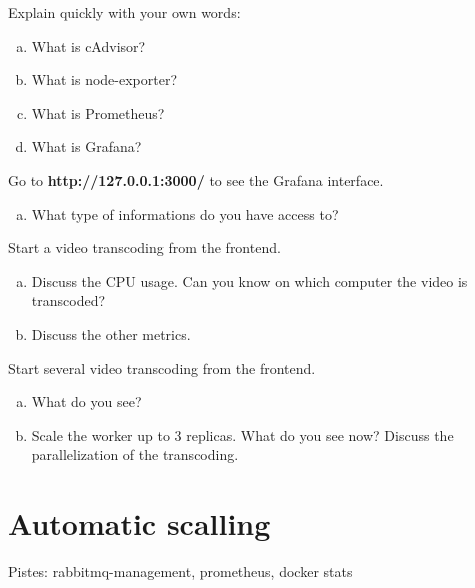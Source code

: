 \documentclass[a4paper,11pt]{exam}
\begin{document}
\begin{questions}
	\question Explain quickly with your own words:
	\begin{enumerate}[(a)]
		\item What is cAdvisor?
		\item What is node-exporter?
		\item What is Prometheus?
		\item What is Grafana?
	\end{enumerate}
	\question Go to \textbf{http://127.0.0.1:3000/} to see the Grafana interface.
	\begin{enumerate}[(a)]
		\item What type of informations do you have access to?
	\end{enumerate}
	\question Start a video transcoding from the frontend.
	\begin{enumerate}[(a)]
		\item Discuss the CPU usage. Can you know on which computer the video is transcoded?
		\item Discuss the other metrics.
	\end{enumerate}

	\question Start several video transcoding from the frontend.
	\begin{enumerate}[(a)]
		\item What do you see?  
		\item Scale the worker up to 3 replicas. What do you see now? Discuss the parallelization of the transcoding.
	\end{enumerate}
\end{questions}


\section{Automatic scalling}

Pistes: rabbitmq-management, prometheus, docker stats
\end{document}
